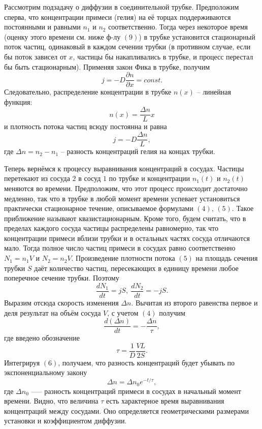 \documentclass[a4paper,12pt]{article}
\begin{document}
Рассмотрим подзадачу о диффузии в соединительной трубке. Предположим сперва, что концентрации примеси (гелия) на её торцах поддерживаются постоянными и равными $n_1$ и $n_2$ соответственно. Тогда через некоторое время (оценку этого времени см. ниже ф-лу $(9)$) в трубке установится стационарный поток частиц, одинаковый в каждом сечении трубки (в противном случае, если бы поток зависел от $x$, частицы бы накапливались в трубке, и процесс перестал бы быть стационарным). Применяя закон Фика в трубке, получим $$j = -D \dfrac{\partial n}{\partial x} = const.$$
Следовательно, распределение концентрации в трубке $n(x)$ -- линейная функция:
\begin{equation}
	n(x) = \dfrac{\Delta n}{L} x
\end{equation}
и плотность потока частиц всюду постоянна и равна
\begin{equation}
	j = -D \dfrac{\Delta n}{L},
\end{equation}
где $\Delta n = n_2 - n_1$ -- разность концентраций гелия на концах трубки.

Теперь вернёмся к процессу выравнивания концентраций в сосудах. Частицы перетекают из сосуда $2$ в сосуд $1$ по трубке и концентрации $n_1(t)$ и $n_2(t)$ меняются во времени. Предположим, что этот процесс происходит достаточно медленно, так что в трубке в любой момент времени успевает установиться практически стационарное течение, описываемое формулами $(4)$, $(5)$. Такое приближение называют квазистационарным. Кроме того, будем считать, что в пределах каждого сосуда частицы распределены равномерно, так что концентрации примеси вблизи трубки и в остальных частях сосуда отличаются мало. Тогда полное число частиц примеси в сосудах равно соответственно $N_1 = n_1 V$ и $N_2 = n_2 V$. Произведение плотности потока $(5)$ на площадь сечения трубки $S$ даёт количество частиц, пересекающих в единицу времени любое поперечное сечение трубки. Поэтому
\begin{equation}
	\dfrac{dN_1}{dt} = jS, ~\dfrac{dN_2}{dt} = -jS.
\end{equation}
Выразим отсюда скорость изменения $\Delta n$. Вычитая из второго равенства первое и деля результат на объём сосуда $V$, с учетом $(4)$ получим
\begin{equation}
	\dfrac{d(\Delta n)}{dt} = - \dfrac{\Delta n}{\tau},
\end{equation}
где введено обозначение
\begin{equation}
	\tau = \dfrac{1}{D} \dfrac{VL}{2S}.
\end{equation}
Интегрируя $(6)$, получаем, что разность концентраций будет убывать по экспоненциальному закону
\begin{equation}
	\Delta n = \Delta n_0 e^{-t/\tau},
\end{equation}
где $\Delta n_0$ --— разность концентраций примеси в сосудах в начальный момент времени. Видно, что величина $\tau$ есть характерное время выравнивания концентраций между сосудами. Оно определяется геометрическими размерами установки и коэффициентом диффузии.
\end{document}
